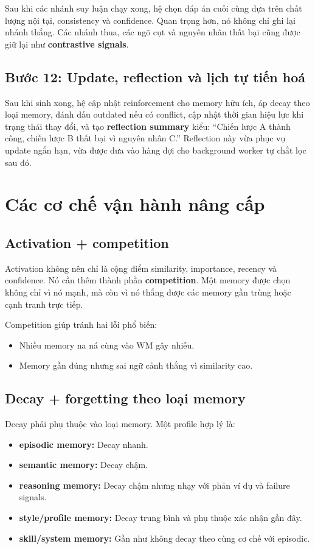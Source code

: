 \documentclass[a4paper,12pt]{article}
\begin{document}
Sau khi các nhánh suy luận chạy xong, hệ chọn đáp án cuối cùng dựa trên chất lượng nội tại, consistency và confidence. Quan trọng hơn, nó không chỉ ghi lại nhánh thắng. Các nhánh thua, các ngõ cụt và nguyên nhân thất bại cũng được giữ lại như \textbf{contrastive signals}.

\subsection*{Bước 12: Update, reflection và lịch tự tiến hoá}

Sau khi sinh xong, hệ cập nhật reinforcement cho memory hữu ích, áp decay theo loại memory, đánh dấu outdated nếu có conflict, cập nhật thời gian hiệu lực khi trạng thái thay đổi, và tạo \textbf{reflection summary} kiểu: ``Chiến lược A thành công, chiến lược B thất bại vì nguyên nhân C.'' Reflection này vừa phục vụ update ngắn hạn, vừa được đưa vào hàng đợi cho background worker tự chắt lọc sau đó.

\section{Các cơ chế vận hành nâng cấp}

\subsection*{Activation + competition}

Activation không nên chỉ là cộng điểm similarity, importance, recency và confidence. Nó cần thêm thành phần \textbf{competition}. Một memory được chọn không chỉ vì nó mạnh, mà còn vì nó thắng được các memory gần trùng hoặc cạnh tranh trực tiếp.

Competition giúp tránh hai lỗi phổ biến:
\begin{itemize}
    \item Nhiều memory na ná cùng vào WM gây nhiễu.
    \item Memory gần đúng nhưng sai ngữ cảnh thắng vì similarity cao.
\end{itemize}

\subsection*{Decay + forgetting theo loại memory}

Decay phải phụ thuộc vào loại memory. Một profile hợp lý là:
\begin{itemize}
    \item \textbf{episodic memory:} Decay nhanh.
    \item \textbf{semantic memory:} Decay chậm.
    \item \textbf{reasoning memory:} Decay chậm nhưng nhạy với phản ví dụ và failure signals.
    \item \textbf{style/profile memory:} Decay trung bình và phụ thuộc xác nhận gần đây.
    \item \textbf{skill/system memory:} Gần như không decay theo cùng cơ chế với episodic.
\end{itemize}
\end{document}

